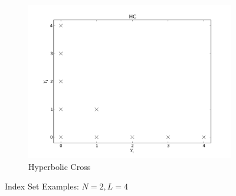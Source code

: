 \documentclass[11pt]{article}
\begin{document}
\begin{figure}[H]
\begin{subfigure}[b]{0.32 \textwidth}
   \includegraphics[width=\textwidth]{HC}
   \caption{Hyperbolic Cross}
   \label{HC}
  \end{subfigure}
  \caption{Index Set Examples: $N=2,L=4$}
  \label{indexsets}
\end{figure}
\end{document}
